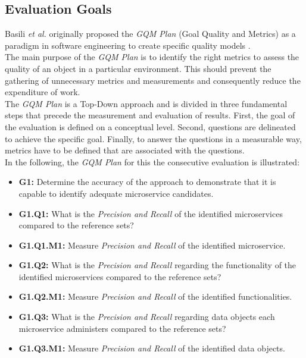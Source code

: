 \subsection{Evaluation Goals}
\label{sec:Evaluation:GQM}
Basili \textit{et al.} originally proposed the \textit{GQM Plan} (Goal Quality and Metrics) as a paradigm in software engineering to create specific quality models \cite{BasiliGQM}. \\
The main purpose of the \textit{GQM Plan} is to identify the right metrics to assess the quality of an object in a particular environment. This should prevent the gathering of unnecessary metrics and measurements and consequently reduce the expenditure of work. \\
The \textit{GQM Plan} is a Top-Down approach and is divided in three fundamental steps that precede the measurement and evaluation of results. First, the goal of the evaluation is defined on a conceptual level. Second, questions are delineated to achieve the specific goal. Finally, to answer the questions in a measurable way, metrics have to be defined that are associated with the questions. \\
In the following, the \textit{GQM Plan} for this the consecutive evaluation is illustrated:

\begin{itemize}
	\item \textbf{G1:} Determine the accuracy of the approach to demonstrate that it is capable to identify adequate microservice candidates.
	\item \textbf{G1.Q1:} What is the \textit{Precision and Recall} of the identified microservices compared to the reference sets?
	\item \textbf{G1.Q1.M1:} Measure \textit{Precision and Recall } of the identified microservice.
	\item \textbf{G1.Q2:} What is the \textit{Precision and Recall} regarding the functionality of the identified microservices compared to the reference sets?
	\item \textbf{G1.Q2.M1:}  Measure \textit{Precision and Recall} of the identified functionalities.
	\item \textbf{G1.Q3:} What is the \textit{Precision and Recall} regarding data objects each microservice administers compared to the reference sets?
	\item \textbf{G1.Q3.M1:}  Measure \textit{Precision and Recall} of the identified data objects.

\end{itemize}




